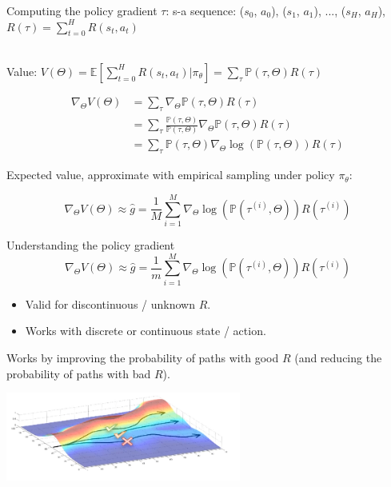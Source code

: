 \documentclass{beamer}
\begin{document}
\begin{frame}{Computing the policy gradient}
  $\tau$: s-a sequence: ($s_0$, $a_0$), ($s_1$, $a_1$), ..., ($s_H$, $a_H$), $R(\tau) = \sum_{t=0}^{H}R(s_t, a_t)$ \\~\\

  \begin{center}
    Value: $V(\Theta) = \mathbb{E} \left[ \sum_{t=0}^{H} R(s_t, a_t) | \pi_{\theta} \right] = \sum_{\tau} \mathbb{P}(\tau, \Theta) R(\tau)$ \\
  \end{center}

  \begin{align*}
    \nabla_{\Theta} V(\Theta) &= \sum_{\tau} \nabla_{\Theta} \mathbb{P}(\tau, \Theta) R(\tau) \\
                              &= \sum_{\tau} \frac{\mathbb{P}(\tau, \Theta)}{\mathbb{P}(\tau, \Theta)} \nabla_{\Theta} \mathbb{P}(\tau, \Theta) R(\tau) \\
                              &= \sum_{\tau} \mathbb{P}(\tau, \Theta) \nabla_{\Theta} \log \left( \mathbb{P}(\tau, \Theta) \right) R(\tau)
  \end{align*}

  Expected value, approximate with empirical sampling under policy $\pi_{\theta}$:

  $$ \nabla_{\Theta} V(\Theta) \approx \hat{g} = \frac{1}{M} \sum_{i=1}^{M} \nabla_{\Theta} \log \left( \mathbb{P}(\tau^{(i)}, \Theta) \right) R(\tau^{(i)})$$
\end{frame}

\begin{frame}{Understanding the policy gradient}
  $$ \nabla_{\Theta} V(\Theta) \approx \hat{g} = \frac{1}{m} \sum_{i=1}^{M} \nabla_{\Theta} \log \left( \mathbb{P}(\tau^{(i)}, \Theta) \right) R(\tau^{(i)})$$

  \begin{itemize}
    \item Valid for discontinuous / unknown $R$.
    \item Works with discrete or continuous state / action. \\
  \end{itemize}

  Works by improving the probability of paths with good $R$ (and reducing the probability of paths with bad $R$).

  \begin{center}
    \includegraphics[width=0.58\textwidth]{Figures/illustration_policy_gradient}
  \end{center}
\end{frame}
\end{document}
